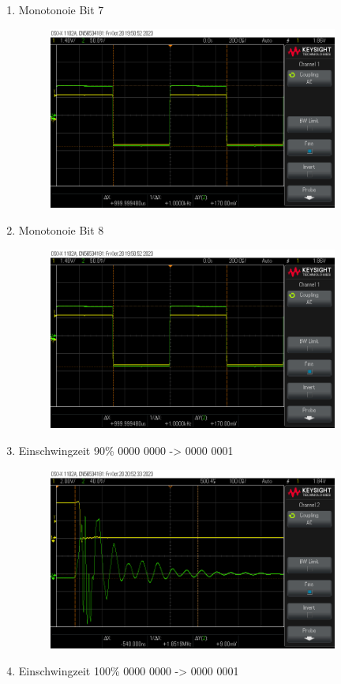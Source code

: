 {\begin{enumerate}[label=\Alph*.]
	\item Monotonoie Bit 7
	\begin{figure}[H]
		\centering
		\includegraphics[height=6cm]{images/monotonie 6-8bit(170mv).png} 
	\end{figure}
	\item Monotonoie Bit 8
	\begin{figure}[H]
		\centering
		\includegraphics[height=6cm]{images/monotonie 6-8bit(170mv).png} 
	\end{figure}
	\pagebreak
	\item Einschwingzeit 90\% 0000 0000 -> 0000 0001
	\begin{figure}[H]
		\centering
		\includegraphics[height=6cm]{images/einschwingszeit00000000-00000001_90proz.png}
	\end{figure}
	\item Einschwingzeit 100\% 0000 0000 -> 0000 0001

\end{enumerate}}
